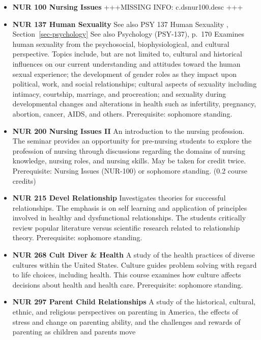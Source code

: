 \documentclass[
  letterpaper,
]{scrbook}
\providecommand{\tightlist}{%
  \setlength{\itemsep}{0pt}\setlength{\parskip}{0pt}}
\begin{document}
\begin{itemize}
\tightlist
\item
  \textbf{NUR 100 Nursing Issues} +++MISSING INFO: c.dsnur100.desc +++\\
\item
  \textbf{NUR 137 Human Sexuality} See also PSY 137 Human Sexuality ,
  Section~\ref{sec-psychology} See also Psychology (PSY-137), p.~170
  Examines human sexuality from the psychosocial, biophysiological, and
  cultural perspective. Topics include, but are not limited to, cultural
  and historical influences on our current understanding and attitudes
  toward the human sexual experience; the development of gender roles as
  they impact upon political, work, and social relationships; cultural
  aspects of sexuality including intimacy, courtship, marriage, and
  procreation; and sexuality during developmental changes and
  alterations in health such as infertility, pregnancy, abortion,
  cancer, AIDS, and others. Prerequisite: sophomore standing.
\item
  \textbf{NUR 200 Nursing Issues II} An introduction to the nursing
  profession. The seminar provides an opportunity for pre-nursing
  students to explore the profession of nursing through discussions
  regarding the domains of nursing knowledge, nursing roles, and nursing
  skills. May be taken for credit twice. Prerequisite: Nursing Issues
  (NUR-100) or sophomore standing. (0.2 course credits)
\item
  \textbf{NUR 215 Devel Relationship} Investigates theories for
  successful relationships. The emphasis is on self learning and
  application of principles involved in healthy and dysfunctional
  relationships. The students critically review popular literature
  versus scientific research related to relationship theory.
  Prerequisite: sophomore standing.\\
\item
  \textbf{NUR 268 Cult Diver \& Health} A study of the health practices
  of diverse cultures within the United States. Culture guides problem
  solving with regard to life choices, including health. This course
  examines how culture affects decisions about health and health care.
  Prerequisite: sophomore standing.
\item
  \textbf{NUR 297 Parent Child Relationships} A study of the historical,
  cultural, ethnic, and religious perspectives on parenting in America,
  the effects of stress and change on parenting ability, and the
  challenges and rewards of parenting as children and parents move

\end{itemize}
\end{document}
